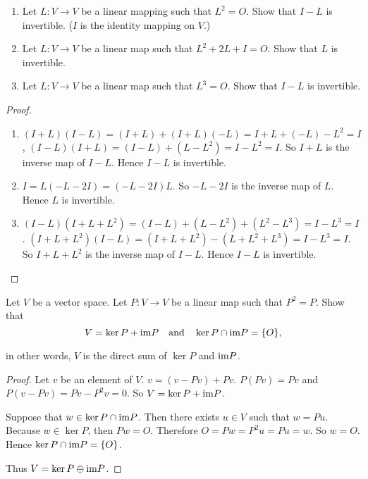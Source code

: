 \begin{exercise}
    \begin{enumerate}[label={(\alph*)}]
        \item Let $L: V \to V$ be a linear mapping such that $L^{2} = O$. Show that $I - L$ is invertible. ($I$ is the identity mapping on $V$.)
        \item Let $L: V \to V$ be a linear map such that $L^{2} + 2L + I = O$. Show that $L$ is invertible.
        \item Let $L: V \to V$ be a linear map such that $L^{3} = O$. Show that $I - L$ is invertible.
    \end{enumerate}
\end{exercise}

\begin{proof}
    \begin{enumerate}[label={(\alph*)}]
        \item $(I + L)(I - L) = (I + L) + (I + L)(-L) = I + L + (-L) - L^{2} = I$, $(I - L)(I + L) = (I - L) + (L - L^{2}) = I - L^{2} = I$. So $I + L$ is the inverse map of $I - L$. Hence $I - L$ is invertible.
        \item $I = L(-L-2I) = (-L-2I)L$. So $-L-2I$ is the inverse map of $L$. Hence $L$ is invertible.
        \item $(I - L)(I + L + L^{2}) = (I - L) + (L - L^{2}) + (L^{2} - L^{3}) = I - L^{3} = I$. $(I + L + L^{2})(I - L) = (I + L + L^{2}) - (L + L^{2} + L^{3}) = I - L^{3} = I$. So $I + L + L^{2}$ is the inverse map of $I - L$. Hence $I - L$ is invertible.
    \end{enumerate}
\end{proof}

\begin{exercise}
    Let $V$ be a vector space. Let $P: V \to V$ be a linear map such that $P^{2} = P$. Show that
    \[
        V = \ker P + \text{im} P \quad\text{and}\quad \ker P \cap \text{im} P = \{ O \},
    \]

    in other words, $V$ is the direct sum of $\ker P$ and $\text{im} P$.
\end{exercise}

\begin{proof}
    Let $v$ be an element of $V$. $v = (v - Pv) + Pv$. $P(Pv) = Pv$ and $P(v - Pv) = Pv - P^{2}v = 0$. So $V = \ker P + \text{im} P$.

    Suppose that $w\in \ker P\cap \text{im} P$. Then there exists $u\in V$ such that $w = Pu$. Because $w\in \ker P$, then $Pw = O$. Therefore $O = Pw = P^{2}u = Pu = w$. So $w = O$. Hence $\ker P\cap \text{im} P = \{ O \}$.

    Thus $V = \ker P \oplus \text{im} P$.
\end{proof}

